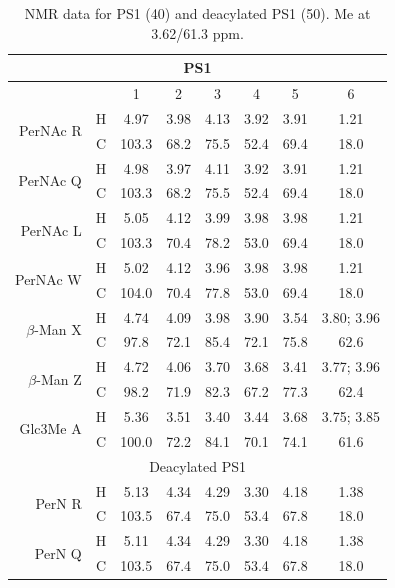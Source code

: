 \begin{table}[hp] %
  \centering\onehalfspacing %
  \caption[\Ac{NMR} data for \caulobacter \ac{PS}1]{\Ac{NMR} data for \caulobacter \ac{PS}1 (40\cel) and deacylated \ac{PS}1 (50\cel). Me at 3.62/61.3 ppm.}
  \label{tbl:lpsops}
  \begin{tabular}{@{}rccccccc@{}}
    \toprule
    \multicolumn{8}{c}{PS1} \\ \midrule
 &   & 1     & 2    & 3    & 4    & 5    & 6 \\ \midrule
    \multirow{2}{*}{PerNAc R}      & H & 4.97  & 3.98 & 4.13 & 3.92 & 3.91 & 1.21 \\
 & C & 103.3 & 68.2 & 75.5 & 52.4 & 69.4 & 18.0 \\
    \multirow{2}{*}{PerNAc Q}      & H & 4.98  & 3.97 & 4.11 & 3.92 & 3.91 & 1.21 \\
 & C & 103.3 & 68.2 & 75.5 & 52.4 & 69.4 & 18.0 \\
    \multirow{2}{*}{PerNAc L}      & H & 5.05  & 4.12 & 3.99 & 3.98 & 3.98 & 1.21 \\
 & C & 103.3 & 70.4 & 78.2 & 53.0 & 69.4 & 18.0 \\
    \multirow{2}{*}{PerNAc W}      & H & 5.02  & 4.12 & 3.96 & 3.98 & 3.98 & 1.21 \\
 & C & 104.0 & 70.4 & 77.8 & 53.0 & 69.4 & 18.0 \\
    \multirow{2}{*}{$\beta$-Man X} & H & 4.74  & 4.09 & 3.98 & 3.90 & 3.54 & 3.80; 3.96 \\
 & C & 97.8  & 72.1 & 85.4 & 72.1 & 75.8 & 62.6 \\
    \multirow{2}{*}{$\beta$-Man Z} & H & 4.72  & 4.06 & 3.70 & 3.68 & 3.41 & 3.77; 3.96 \\
 & C & 98.2  & 71.9 & 82.3 & 67.2 & 77.3 & 62.4 \\
    \multirow{2}{*}{Glc3Me A}      & H & 5.36  & 3.51 & 3.40 & 3.44 & 3.68 & 3.75; 3.85 \\
 & C & 100.0 & 72.2 & 84.1 & 70.1 & 74.1 & 61.6 \\ \midrule
    \multicolumn{8}{c}{Deacylated PS1} \\ \midrule
    \multirow{2}{*}{PerN R}        & H & 5.13  & 4.34 & 4.29 & 3.30 & 4.18 & 1.38 \\
 & C & 103.5 & 67.4 & 75.0 & 53.4 & 67.8 & 18.0 \\
    \multirow{2}{*}{PerN Q}        & H & 5.11  & 4.34 & 4.29 & 3.30 & 4.18 & 1.38 \\
 & C & 103.5 & 67.4 & 75.0 & 53.4 & 67.8 & 18.0 \\

\end{tabular}
\end{table}
